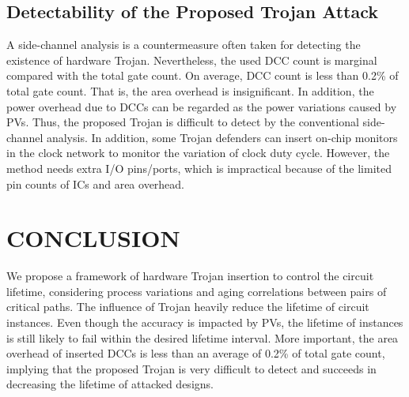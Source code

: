 \subsection{Detectability of the Proposed Trojan Attack}
\label{sec:exp:det}
A side-channel analysis is a countermeasure often taken for detecting the existence of hardware Trojan. Nevertheless, the used DCC count is marginal compared with the total gate count. On average, DCC count is less than 0.2\% of total gate count. That is, the area overhead is insignificant. In addition, the power overhead due to DCCs can be regarded as the power variations caused by PVs. Thus, the proposed Trojan is difficult to detect by the conventional side-channel analysis. In addition, some Trojan defenders can insert on-chip monitors in the clock network to monitor the variation of clock duty cycle. However, the method needs extra I/O pins/ports, which is impractical because of the limited pin counts of ICs and area overhead.


\section{CONCLUSION}
We propose a framework of hardware Trojan insertion to control the circuit lifetime, considering process variations and aging correlations between pairs of critical paths. The influence of Trojan heavily reduce the lifetime of circuit instances. Even though the accuracy is impacted by PVs, the lifetime of instances is still likely to fail within the desired lifetime interval. More important, the area overhead of inserted DCCs is less than an average of 0.2\% of total gate count, implying that the proposed Trojan is very difficult to detect and succeeds in decreasing the lifetime of attacked designs.
